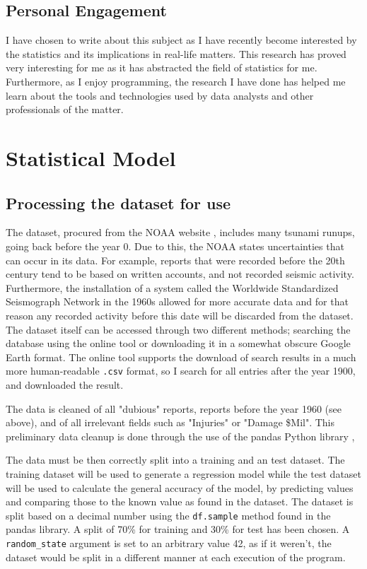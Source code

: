 \documentclass[11pt,letterpaper]{article}
\begin{document}
\subsection{Personal Engagement}

I have chosen to write about this subject as I have recently become interested by the
statistics and its implications in real-life matters. This research has proved very
interesting for me as it has abstracted the field of statistics for me. Furthermore,
as I enjoy programming, the research I have done has helped me learn about the tools
and technologies used by data analysts and other professionals of the matter.

\section{Statistical Model}

\subsection{Processing the dataset for use}

The dataset, procured from the NOAA website \cite{noaa}, includes many tsunami
runups, going back before the year 0. Due to this, the NOAA states uncertainties
that can occur in its data. For example, reports that were recorded before the
20th century tend to be based on written accounts, and not recorded seismic activity.
Furthermore, the installation of a system called the Worldwide Standardized Seismograph
Network in the 1960s allowed for more accurate data and for that reason any recorded
activity before this date will be discarded from the dataset. The dataset itself can
be accessed through two different methods; searching the database using the online
tool or downloading it in a somewhat obscure Google Earth format. The online tool
supports the download of search results in a much more human-readable \verb|.csv| format,
so I search for all entries after the year 1900, and downloaded the result.

The data is cleaned of all "dubious" reports, reports before the year 1960 (see above), and
of all irrelevant fields such as "Injuries" or "Damage \$Mil". This preliminary data cleanup
is done through the use of the pandas Python library \cite{reback2020pandas}\cite{mckinney-proc-scipy-2010},

The data must be then correctly split into a training and an test dataset. The training
dataset will be used to generate a regression model while the test dataset will
be used to calculate the general accuracy of the model, by predicting values and
comparing those to the known value as found in the dataset. The dataset is split based on
a decimal number using the \verb|df.sample| method found in the pandas library. A split
of 70\% for training and 30\% for test has been chosen. A \verb|random_state| argument is
set to an arbitrary value 42, as if it weren't, the dataset would be split in a different
manner at each execution of the program.
\end{document}
